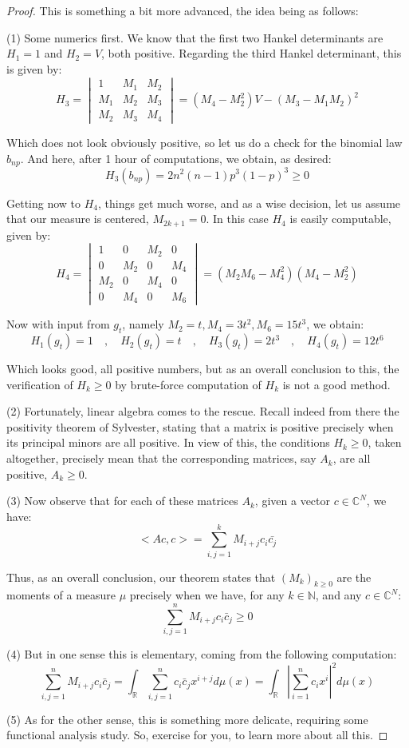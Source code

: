 \documentclass[12pt]{amsbook}
\begin{document}
\begin{proof}
This is something a bit more advanced, the idea being as follows:

\medskip

(1) Some numerics first. We know that the first two Hankel determinants are $H_1=1$ and $H_2=V$, both positive. Regarding the third Hankel determinant, this is given by:
$$H_3=\begin{vmatrix}
1&M_1&M_2\\
M_1&M_2&M_3\\
M_2&M_3&M_4
\end{vmatrix}=(M_4-M_2^2)V-(M_3-M_1M_2)^2$$

Which does not look obviously positive, so let us do a check for the binomial law $b_{np}$. And here, after 1 hour of computations, we obtain, as desired:
$$H_3(b_{np})=2n^2(n-1)p^3(1-p)^3\geq0$$

Getting now to $H_4$, things get much worse, and as a wise decision, let us assume that our measure is centered, $M_{2k+1}=0$. In this case $H_4$ is easily computable, given by:
$$H_4=\begin{vmatrix}
1&0&M_2&0\\
0&M_2&0&M_4\\
M_2&0&M_4&0\\
0&M_4&0&M_6
\end{vmatrix}=(M_2M_6-M_4^2)(M_4-M_2^2)$$

Now with input from $g_t$, namely $M_2=t,M_4=3t^2,M_6=15t^3$, we obtain:
$$H_1(g_t)=1\quad,\quad H_2(g_t)=t\quad,\quad H_3(g_t)=2t^3\quad,\quad H_4(g_t)=12t^6$$

Which looks good, all positive numbers, but as an overall conclusion to this, the verification of $H_k\geq0$ by brute-force computation of $H_k$ is not a good method.

\medskip

(2) Fortunately, linear algebra comes to the rescue. Recall indeed from there the positivity theorem of Sylvester, stating that a matrix is positive precisely when its principal minors are all positive. In view of this, the conditions $H_k\geq0$, taken altogether, precisely mean that the corresponding matrices, say $A_k$, are all positive, $A_k\geq0$. 

\medskip

(3) Now observe that for each of these matrices $A_k$, given a vector $c\in\mathbb C^N$, we have:
$$<Ac,c>=\sum_{i,j=1}^kM_{i+j}c_i\bar{c_j}$$

Thus, as an overall conclusion, our theorem states that $(M_k)_{k\geq0}$ are the moments of a measure $\mu$ precisely when we have, for any $k\in\mathbb N$, and any $c\in\mathbb C^N$:
$$\sum_{i,j=1}^nM_{i+j}c_i\bar{c}_j\geq0$$

(4) But in one sense this is elementary, coming from the following computation:
$$\sum_{i,j=1}^nM_{i+j}c_i\bar{c}_j
=\int_\mathbb R\sum_{i,j=1}^nc_i\bar{c}_jx^{i+j}d\mu(x)
=\int_\mathbb R\left|\sum_{i=1}^nc_ix^i\right|^2d\mu(x)$$

(5) As for the other sense, this is something more delicate, requiring some functional analysis study. So, exercise for you, to learn more about all this.
\end{proof}
\end{document}
